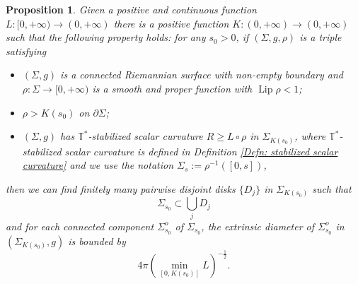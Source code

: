 \documentclass[10pt,a4paper]{amsart}
\newtheorem{proposition}{Proposition}
\DeclareMathOperator{\Lip}{Lip}
\begin{document}
\begin{proposition}\label{Prop: interior}
     Given a positive and continuous function $L:[0,+\infty)\to (0,+\infty)$ there is a positive function $K:(0,+\infty)\to (0,+\infty)$ such that the following property holds: for any $s_{0}>0$, if $(\Sigma,g,\rho)$ is a triple  satisfying
    \begin{itemize}\setlength{\itemsep}{1mm}
        \item $(\Sigma,g)$ is a connected Riemannian surface with non-empty boundary and $\rho:\Sigma\to[0,+\infty)$ is a smooth and proper function with $\Lip\rho <1$;
        \item

        $\rho>K(s_0)$ on $\partial\Sigma$;



        \item  $(\Sigma,g)$ has $\mathbb{T}^*$-stabilized scalar curvature $R\geq L\circ \rho$ in $\Sigma_{K(s_0)}$, where $\mathbb{T}^*$-stabilized scalar curvature is defined in Definition \ref{Defn: stabilized scalar curvature} and we use the notation $\Sigma_s:=\rho^{-1}([0,s])$,
    \end{itemize}
    then we can find finitely many pairwise disjoint disks $\{D_j\}$ in $\Sigma_{K(s_0)}$ such that
    $$\Sigma_{s_0}\subset\bigcup_j D_j$$
    and for each connected component $\Sigma_{s_0}^{o}$ of $\Sigma_{s_0}$, the extrinsic diameter of $\Sigma_{s_0}^{o}$ in $(\Sigma_{K(s_0)},g)$ is bounded by
   $$ 4\pi \left(\min_{[0,K(s_0)]}L\right)^{-\frac{1}{2}}.$$
\end{proposition}
\end{document}

